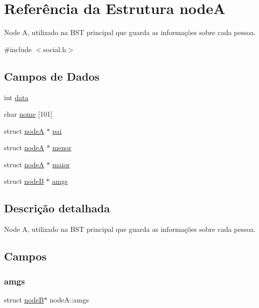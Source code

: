 \hypertarget{structnodeA}{}\section{Referência da Estrutura nodeA}
\label{structnodeA}


Node A, utilizado na B\+ST principal que guarda as informações sobre cada pessoa.  




{\ttfamily \#include $<$social.\+h$>$}

\subsection*{Campos de Dados}
\begin{DoxyCompactItemize}
\item 
int \mbox{\hyperlink{structnodeA_ad3adb17ccc0d5912b4642e49b7f2cf91}{data}}
\item 
char \mbox{\hyperlink{structnodeA_abb21dead329c9c152aaf2544337b26d7}{nome}} \mbox{[}101\mbox{]}
\item 
struct \mbox{\hyperlink{structnodeA}{nodeA}} $\ast$ \mbox{\hyperlink{structnodeA_a0ff9bb5e43589704c3ce4eb4434d76af}{pai}}
\item 
struct \mbox{\hyperlink{structnodeA}{nodeA}} $\ast$ \mbox{\hyperlink{structnodeA_a240c2a666e348701276be151d0dc6f9a}{menor}}
\item 
struct \mbox{\hyperlink{structnodeA}{nodeA}} $\ast$ \mbox{\hyperlink{structnodeA_af3a6276035abe3f5912b42d5334b84f2}{maior}}
\item 
struct \mbox{\hyperlink{structnodeB}{nodeB}} $\ast$ \mbox{\hyperlink{structnodeA_a618b5972693f9ff48d59387eced6eb09}{amgs}}
\end{DoxyCompactItemize}


\subsection{Descrição detalhada}
Node A, utilizado na B\+ST principal que guarda as informações sobre cada pessoa. 

\subsection{Campos}
\mbox{\label{structnodeA_a618b5972693f9ff48d59387eced6eb09}} 
\subsubsection{\texorpdfstring{amgs}{amgs}}
{\footnotesize\ttfamily struct \mbox{\hyperlink{structnodeB}{nodeB}}$\ast$ node\+A\+::amgs}

